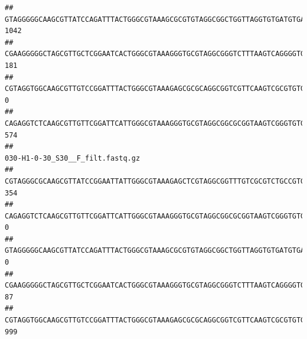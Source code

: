 \documentclass[]{article}
\begin{document}
\begin{verbatim}
## GTAGGGGGCAAGCGTTATCCAGATTTACTGGGCGTAAAGCGCGTGTAGGCGGCTGGTTAGGTGTGATGTGAAATCTTCCGGCTCAACCGGAAAACTGCATTGCAAACCGGCCTGGCTAGAGTGCAGGAGAGGGAAGCGGAATTCCAGGTGTAGCGGTGAAATGCGTAGATATCTGGAGGAACACCAGTGGCGAAGGCGGCTTCCTGGCCTGCAACTGACGCTGAGACGCGAAAGCGTGGGGAGCGAAC                              1042
## CGAAGGGGGCTAGCGTTGCTCGGAATCACTGGGCGTAAAGGGTGCGTAGGCGGGTCTTTAAGTCAGGGGTGAAATCCTGGAGCTCAACTCCAGAACTGCCTTTGATACTGAAGATCTTGAGTTCGGGAGAGGTGAGTGGAACTGCGAGTGTAGAGGTGAAATTCGTAGATATTCGCAAGAACACCAGTGGCGAAGGCGGCTCACTGGCCCGATACTGACGCTGAGGCACGAAAGCGTGGGGAGCAAACA                              181
## CGTAGGTGGCAAGCGTTGTCCGGATTTACTGGGCGTAAAGAGCGCGCAGGCGGTCGTTCAAGTCGCGTGTGAAAGCCCCCGGCTCAACTGGGGAGGGTCACGCGATACTGATCGACTCGAAGGCAGGAGAGGGTAGTGGAATTCCCGGTGTAGTGGTGAAATGCGTAGATATCGGGAGGAACACCAGTGGCGAAGGCGACTACCTGGCCTGTTCTTGACGCTGAGGCGCGAAAGCTAGGGGAGCAAACG                                0
## CAGAGGTCTCAAGCGTTGTTCGGATTCATTGGGCGTAAAGGGTGCGTAGGCGGCGCGGTAAGTCGGGTGTGAAATCTCGGGGCTTAACTCCGAAACTGCATTCGATACTGCCGTGCTTGAGGACTGGAGAGGAGACTGGAATTTACGGTGTAGCGGTGAAATGCGTAGATATCGTAAGGAAGACCAGTGGCGAAGGCGGGTCTCTGGACAGTTCCTGACGCTGAGGCACGAAGGCCAGGGGAGCAAACG                              574
##                                                                                                                                                                                                                                                           030-H1-0-30_S30__F_filt.fastq.gz
## CGTAGGGCGCAAGCGTTATCCGGAATTATTGGGCGTAAAGAGCTCGTAGGCGGTTTGTCGCGTCTGCCGTGAAAGTCCGGGGCTCAACTCCGGATCTGCGGTGGGTACGGGCAGACTAGAGTGATGTAGGGGAGACTGGAATTCCTGGTGTAGCGGTGAAATGCGCAGATATCAGGAGGAACACCGATGGCGAAGGCAGGTCTCTGGGCATTAACTGACGCTGAGGAGCGAAAGCATGGGGAGCGAACA                              354
## CAGAGGTCTCAAGCGTTGTTCGGATTCATTGGGCGTAAAGGGTGCGTAGGCGGCGCGGTAAGTCGGGTGTGAAATCTCGGAGCTTAACTCCGAAACTGCATTCGATACTGCCGTGCTTGAGGACTGGAGAGGAGACTGGAATTTACGGTGTAGCGGTGAAATGCGTAGATATCGTAAGGAAGACCAGTGGCGAAGGCGGGTCTCTGGACAGTTCCTGACGCTGAGGCACGAAGGCCAGGGGAGCAAACG                                0
## GTAGGGGGCAAGCGTTATCCAGATTTACTGGGCGTAAAGCGCGTGTAGGCGGCTGGTTAGGTGTGATGTGAAATCTTCCGGCTCAACCGGAAAACTGCATTGCAAACCGGCCTGGCTAGAGTGCAGGAGAGGGAAGCGGAATTCCAGGTGTAGCGGTGAAATGCGTAGATATCTGGAGGAACACCAGTGGCGAAGGCGGCTTCCTGGCCTGCAACTGACGCTGAGACGCGAAAGCGTGGGGAGCGAAC                                 0
## CGAAGGGGGCTAGCGTTGCTCGGAATCACTGGGCGTAAAGGGTGCGTAGGCGGGTCTTTAAGTCAGGGGTGAAATCCTGGAGCTCAACTCCAGAACTGCCTTTGATACTGAAGATCTTGAGTTCGGGAGAGGTGAGTGGAACTGCGAGTGTAGAGGTGAAATTCGTAGATATTCGCAAGAACACCAGTGGCGAAGGCGGCTCACTGGCCCGATACTGACGCTGAGGCACGAAAGCGTGGGGAGCAAACA                               87
## CGTAGGTGGCAAGCGTTGTCCGGATTTACTGGGCGTAAAGAGCGCGCAGGCGGTCGTTCAAGTCGCGTGTGAAAGCCCCCGGCTCAACTGGGGAGGGTCACGCGATACTGATCGACTCGAAGGCAGGAGAGGGTAGTGGAATTCCCGGTGTAGTGGTGAAATGCGTAGATATCGGGAGGAACACCAGTGGCGAAGGCGACTACCTGGCCTGTTCTTGACGCTGAGGCGCGAAAGCTAGGGGAGCAAACG                              999

\end{verbatim}
\end{document}
